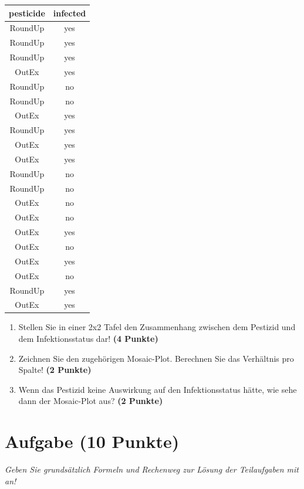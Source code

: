 \documentclass[a4paper, 9pt]{scrartcl}\usepackage[]{graphicx}\usepackage[]{xcolor}
\begin{document}
\begin{table}[!h]
\centering
\begin{tabular}{cc}
\toprule
pesticide & infected\\
\midrule
RoundUp & yes\\
RoundUp & yes\\
RoundUp & yes\\
OutEx & yes\\
RoundUp & no\\
\addlinespace
RoundUp & no\\
OutEx & yes\\
RoundUp & yes\\
OutEx & yes\\
OutEx & yes\\
\addlinespace
RoundUp & no\\
RoundUp & no\\
OutEx & no\\
OutEx & no\\
OutEx & yes\\
\addlinespace
OutEx & no\\
OutEx & yes\\
OutEx & no\\
RoundUp & yes\\
OutEx & yes\\
\bottomrule
\end{tabular}
\end{table}



\begin{enumerate}
\item Stellen Sie in einer 2x2 Tafel den Zusammenhang zwischen dem
  Pestizid und dem Infektionsstatus dar! \textbf{(4 Punkte)}
\item Zeichnen Sie den zugeh{\"o}rigen Mosaic-Plot. Berechnen Sie das
  Verh{\"a}ltnis pro Spalte! \textbf{(2 Punkte)}
\item Wenn das Pestizid keine Auswirkung auf den Infektionsstatus h{\"a}tte, wie
  sehe dann der Mosaic-Plot aus? \textbf{(2 Punkte)}
\end{enumerate} 
\clearpage

\section{Aufgabe \hfill (10 Punkte)}

\textit{Geben Sie grunds{\"a}tzlich Formeln und Rechenweg zur L{\"o}sung der
  Teilaufgaben mit an!} \\[1Ex]
\end{document}
